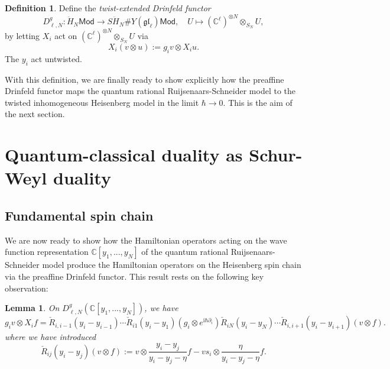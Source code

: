 \documentclass[11pt]{report}
\newtheorem{lemma}[theorem]{Lemma}
\theoremstyle{definition}
\newtheorem{definition}[theorem]{Definition}
\theoremstyle{remark}
\theoremstyle{remark}
\newcommand{\C}{\mathbb{C}}
\newcommand{\I}{\mathrm{i}}
\begin{document}
\begin{definition}
Define the \emph{twist-extended Drinfeld functor}
\begin{equation*}
D_{\ell,N}^g: \ddot H_N\mathsf{Mod} \to S\ddot H_N \# Y(\mathfrak{gl}_\ell)\mathsf{Mod}, \quad U \mapsto (\C^\ell)^{\otimes N} \otimes_{S_N} U,
\end{equation*}
by letting $X_i$ act on $(\C^\ell)^{\otimes N} \otimes_{S_N} U$ via
\begin{equation*}
X_i(v \otimes u) := g_i v \otimes X_i u.
\end{equation*}
The $y_i$ act untwisted.
\end{definition}

With this definition, we are finally ready to show explicitly how the preaffine Drinfeld functor maps the quantum rational Ruijsenaars-Schneider model to the twisted inhomogeneous Heisenberg model in the limit $\hbar \to 0$. This is the aim of the next section.

\section{Quantum-classical duality as Schur-Weyl duality}

\subsection{Fundamental spin chain}

We are now ready to show how the Hamiltonian operators acting on the wave function representation $\C[y_1,...,y_N]$ of the quantum rational Ruijsenaars-Schneider model produce the Hamiltonian operators on the Heisenberg spin chain via the preaffine Drinfeld functor. This result rests on the following key observation:

\begin{lemma}\label{lemma:keyLemma}
On $D_{\ell,N}^g(\C[y_1,...,y_N])$, we have
\begin{equation*}
g_i v \otimes X_i f = \check R_{i,i-1}(y_i-y_{i-1}) \cdots \check R_{i1}(y_i-y_1) (g_i \otimes e^{\I \hbar \partial_i}) \check R_{iN}(y_i-y_N) \cdots \check R_{i,i+1}(y_i-y_{i+1}) (v \otimes f).
\end{equation*}
where we have introduced
\begin{equation*}
\check R_{ij}(y_i-y_j) (v \otimes f) := v \otimes \frac{y_i-y_j}{y_i-y_j-\eta} f - v s_i \otimes \frac{\eta}{y_i-y_j-\eta} f.
\end{equation*}
\end{lemma}
\end{document}
